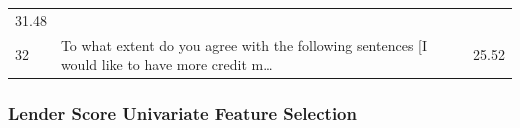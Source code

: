 \begin{longtable}[]{@{}lll@{}}
\begin{minipage}[t]{0.09\columnwidth}
31.48\strut
\end{minipage}\tabularnewline
\begin{minipage}[t]{0.05\columnwidth}\raggedright
32\strut
\end{minipage} & \begin{minipage}[t]{0.77\columnwidth}\raggedright
To what extent do you agree with the following sentences {[}I would like
to have more credit m\ldots{}\strut
\end{minipage} & \begin{minipage}[t]{0.09\columnwidth}\raggedright
25.52\strut
\end{minipage}\tabularnewline
\bottomrule
\end{longtable}

\hypertarget{lender-score-univariate-feature-selection}{%
\subsubsection{Lender Score Univariate Feature
Selection}\label{lender-score-univariate-feature-selection}}

